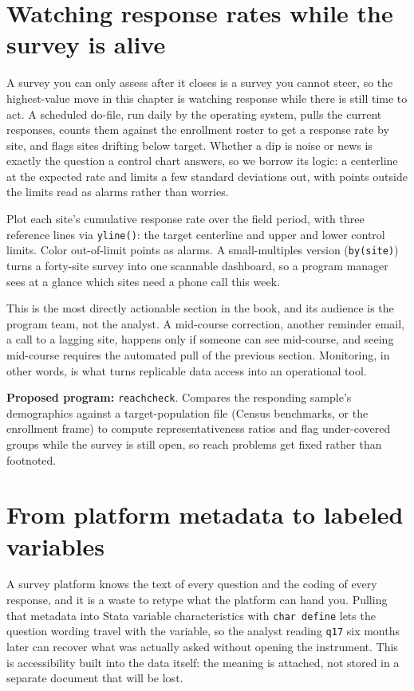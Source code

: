 \documentclass[
    a4paper,
    fontsize=10pt,
    twoside=true,
    numbers=noenddot,
]{kaobook}
\newenvironment{vizcallout}[1][Visualization to build]{%
    \begin{vizbox}[frametitle={#1}]%
}{%
    \end{vizbox}%
}
\begin{document}
\section{Watching response rates while the survey is alive}\label{sec:monitor}
A survey you can only assess after it closes is a survey you cannot steer, so the highest-value move in this chapter is watching response while there is still time to act. A scheduled do-file, run daily by the operating system, pulls the current responses, counts them against the enrollment roster to get a response rate by site, and flags sites drifting below target. Whether a dip is noise or news is exactly the question a control chart answers, so we borrow its logic: a centerline at the expected rate and limits a few standard deviations out, with points outside the limits read as alarms rather than worries.

\begin{vizcallout}[Visualization to build: the response-rate control chart]
Plot each site's cumulative response rate over the field period, with three reference lines via \texttt{yline()}: the target centerline and upper and lower control limits. Color out-of-limit points as alarms. A small-multiples version (\texttt{by(site)}) turns a forty-site survey into one scannable dashboard, so a program manager sees at a glance which sites need a phone call this week.
\end{vizcallout}

This is the most directly actionable section in the book, and its audience is the program team, not the analyst. A mid-course correction, another reminder email, a call to a lagging site, happens only if someone can see mid-course, and seeing mid-course requires the automated pull of the previous section. Monitoring, in other words, is what turns replicable data access into an operational tool.

\begin{kaobox}[frametitle=Ado-file Idea: \texttt{reachcheck}]
\textbf{Proposed program:} \texttt{reachcheck}. Compares the responding sample's demographics against a target-population file (Census benchmarks, or the enrollment frame) to compute representativeness ratios and flag under-covered groups while the survey is still open, so reach problems get fixed rather than footnoted.
\end{kaobox}

\section{From platform metadata to labeled variables}
A survey platform knows the text of every question and the coding of every response, and it is a waste to retype what the platform can hand you. Pulling that metadata into Stata variable characteristics with \texttt{char define} lets the question wording travel with the variable, so the analyst reading \texttt{q17} six months later can recover what was actually asked without opening the instrument. This is accessibility built into the data itself: the meaning is attached, not stored in a separate document that will be lost.
\end{document}
